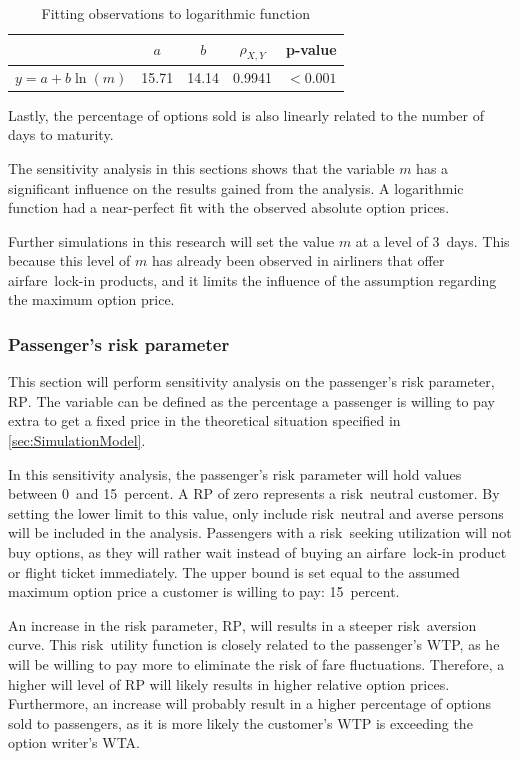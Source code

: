 \begin{table}
\centering
\begin{tabular}{l c c c c}
\toprule
~  &  $a$  &  $b$  &  $\rho_{X,Y}$  & p-value  \\
\midrule
$y = a + b \ln(m)$  &  15.71  &  14.14  &  0.9941  &  $< 0.001$ \\
\bottomrule
\end{tabular}
\caption{Fitting observations to logarithmic function}
\label{tbl:FitMaturity}
\end{table}


Lastly, the percentage of options sold is also linearly related to the number of days to maturity.

The sensitivity analysis in this sections shows that the variable $m$ has a significant influence on the results gained from the analysis. A logarithmic function had a near-perfect fit with the observed absolute option prices.

Further simulations in this research will set the value $m$ at a level of 3~days. This because this level of $m$ has already been observed in airliners that offer airfare~lock-in products, and it limits the influence of the assumption regarding the maximum option price.


\subsubsection{Passenger's risk parameter}
This section will perform sensitivity analysis on the passenger's risk parameter, $\mbox{RP}$. The variable can be defined as the percentage a passenger is willing to pay extra to get a fixed price in the theoretical situation specified in \autoref{sec:SimulationModel}.

In this sensitivity analysis, the passenger's risk parameter will hold values between 0~and 15~percent. A $\mbox{RP}$ of zero represents a risk~neutral customer. By setting the lower limit to this value, only include risk~neutral and averse persons will be included in the analysis. Passengers with a risk~seeking utilization will not buy options, as they will rather wait instead of buying an airfare~lock-in product or flight ticket immediately. The upper bound is set equal to the assumed maximum option price a customer is willing to pay: 15~percent.

An increase in the risk parameter, $\mbox{RP}$, will results in a steeper risk~aversion curve. This risk~utility function is closely related to the passenger's WTP, as he will be willing to pay more to eliminate the risk of fare fluctuations. Therefore, a higher will level of $\mbox{RP}$ will likely results in higher relative option prices. Furthermore, an increase will probably result in a higher percentage of options sold to passengers, as it is more likely the customer's WTP is exceeding the option writer's WTA.

